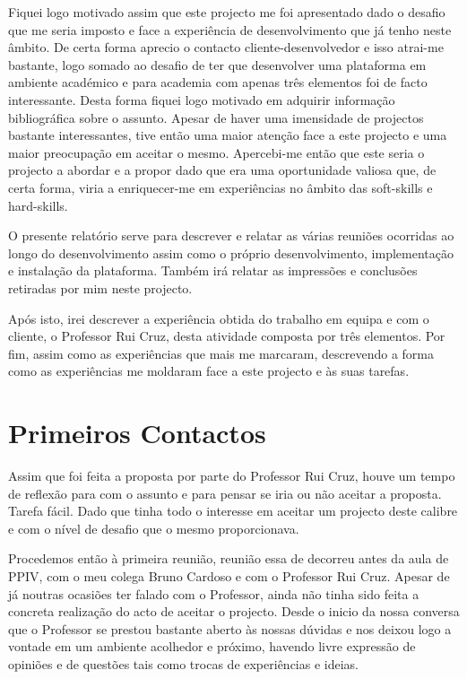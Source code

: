 \documentclass[a4paper,12pt,journal,twoside,compsoc]{PPIEEEtran}
\begin{document}
Fiquei logo motivado assim que este projecto me foi apresentado dado o desafio que me seria imposto e face a experiência de desenvolvimento que já tenho neste âmbito. De certa forma aprecio o contacto cliente-desenvolvedor e isso atrai-me bastante, logo somado ao desafio de ter que desenvolver uma plataforma em ambiente académico e para academia com apenas três elementos foi de facto interessante. Desta forma fiquei logo motivado em adquirir informação bibliográfica sobre o assunto. Apesar de haver uma imensidade de projectos bastante interessantes, tive então uma maior atenção face a este projecto e uma maior preocupação em aceitar o mesmo. Apercebi-me então que este seria o projecto a abordar e a propor dado que era uma oportunidade valiosa que, de certa forma, viria a enriquecer-me em experiências no âmbito das soft-skills e hard-skills.

O presente relatório serve para descrever e relatar as várias reuniões ocorridas ao longo do desenvolvimento assim como o próprio desenvolvimento, implementação e instalação da plataforma. Também irá relatar as impressões e conclusões retiradas por mim neste projecto.

Após isto, irei descrever a experiência obtida do trabalho em equipa e com o cliente, o Professor Rui Cruz, desta atividade composta por três elementos. Por fim, assim como as experiências que mais me marcaram, descrevendo a forma como as experiências me moldaram face a este projecto e às suas tarefas.


\section{Primeiros Contactos}

Assim que foi feita a proposta por parte do Professor Rui Cruz, houve um tempo de reflexão para com o assunto e para pensar se iria ou não aceitar a proposta. Tarefa fácil. Dado que tinha todo o interesse em aceitar um projecto deste calibre e com o nível de desafio que o mesmo proporcionava.

Procedemos então à primeira reunião, reunião essa de decorreu antes da aula de PPIV, com o meu colega Bruno Cardoso e com o Professor Rui Cruz. Apesar de já noutras ocasiões ter falado com o Professor, ainda não tinha sido feita a concreta realização do acto de aceitar o projecto. Desde o inicio da nossa conversa que o Professor se prestou bastante aberto às nossas dúvidas e nos deixou logo a vontade em um ambiente acolhedor e próximo, havendo livre expressão de opiniões e de questões tais como trocas de experiências e ideias.
\end{document}
